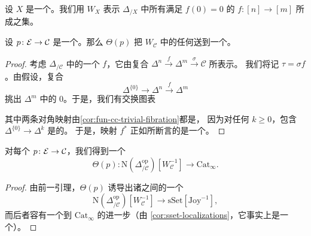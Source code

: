 \begin{definition}\label{def:W-X}
设 $X$ 是一个\trSimplicialSet{}。我们用 $W_X$ 表示 $\Delta_{/X}$ 中所有满足
$f(0) = 0$ 的\trMorphism{} $f\colon [n] \to [m]$ 所成之集。
\end{definition}

\begin{lemma}\label{lem:W-morphisms-joyal-equivalences}
设 $p\colon \mathcal{E} \to \mathcal{C}$ 是一个\trCocartesianFibration{}。那么\trFunctor{}%
$\Theta(p)$ 把 $W_\mathcal{C}$ 中的任何\trMorphism{}送到一个\trJoyalEquivalence{}。
\end{lemma}

\begin{proof}
考虑 $\Delta_{/\mathcal{C}}$ 中的一个\trMorphism{} $f$，它由复合
$\Delta^n \xrightarrow{f} \Delta^m \xrightarrow{\sigma} \mathcal{C}$ 所表示。
我们将记 $\tau = \sigma f$。由假设，复合
\[
\Delta^{\{0\}} \to \Delta^n \xrightarrow{f} \Delta^m
\]
挑出 $\Delta^m$ 中的\trObject{} $0$。于是，我们有交换图表
\begin{center}
\end{center}
其中两条对角映射由\cref{cor:fun-cc-trivial-fibration}都是\trTrivialFibration{}，
因为对任何 $k \ge 0$，包含 $\Delta^{\{0\}} \to \Delta^k$ 是\trLeftAnodyne{}的。
于是，映射 $f^*$ 正如所断言的是一个\trJoyalEquivalence{}。
\end{proof}

\begin{corollary}\label{cor:theta-localization-functor}
对每个\trCocartesianFibration{} $p\colon \mathcal{E} \to \mathcal{C}$，我们得到一个%
\trFunctor{}%
\[
\Theta(p)\colon
\mathrm{N}(\Delta^{\mathrm{op}}_{/\mathcal{C}})[W_\mathcal{C}^{-1}]
\longrightarrow
\mathrm{Cat}_\infty.
\]
\end{corollary}

\begin{proof}
由前一引理，$\Theta(p)$ 诱导出诸\trLocalization{}之间的一个\trFunctor{}%
\[
\mathrm{N}(\Delta^{\mathrm{op}}_{/\mathcal{C}})[W_\mathcal{C}^{-1}]
\longrightarrow
\mathrm{sSet}[\mathrm{Joy}^{-1}],
\]
而后者容有一个到 $\mathrm{Cat}_\infty$ 的进一步\trFunctor{}（由%
\cref{cor:sset-localizations}，它事实上是一个\trEquivalence{}）。
\end{proof}

